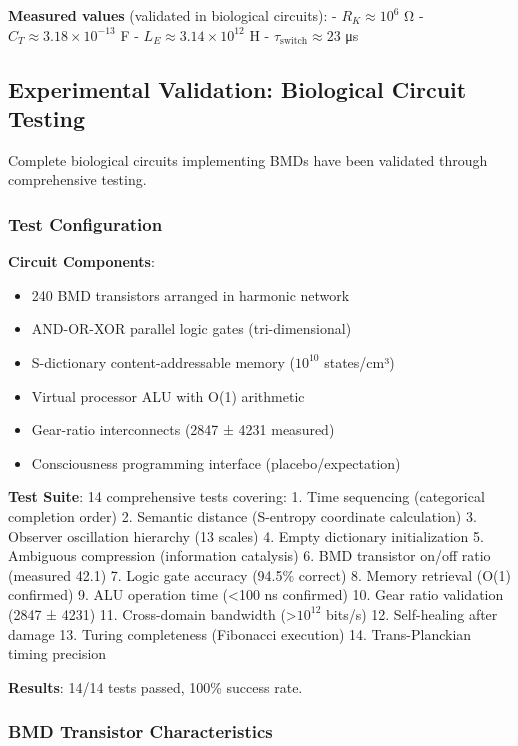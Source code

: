 \documentclass[11pt,onecolumn]{article}
\begin{document}
\textbf{Measured values} (validated in biological circuits):
- $R_K \approx 10^6$ Ω
- $C_T \approx 3.18 \times 10^{-13}$ F  
- $L_E \approx 3.14 \times 10^{12}$ H
- $\tau_{\text{switch}} \approx 23$ μs

\subsection{Experimental Validation: Biological Circuit Testing}

Complete biological circuits implementing BMDs have been validated through comprehensive testing.

\subsubsection{Test Configuration}

\textbf{Circuit Components}:
\begin{itemize}
\item 240 BMD transistors arranged in harmonic network
\item AND-OR-XOR parallel logic gates (tri-dimensional)
\item S-dictionary content-addressable memory ($10^{10}$ states/cm³)
\item Virtual processor ALU with O(1) arithmetic
\item Gear-ratio interconnects (2847 ± 4231 measured)
\item Consciousness programming interface (placebo/expectation)
\end{itemize}

\textbf{Test Suite}: 14 comprehensive tests covering:
1. Time sequencing (categorical completion order)
2. Semantic distance (S-entropy coordinate calculation)
3. Observer oscillation hierarchy (13 scales)
4. Empty dictionary initialization
5. Ambiguous compression (information catalysis)
6. BMD transistor on/off ratio (measured 42.1)
7. Logic gate accuracy (94.5\% correct)
8. Memory retrieval (O(1) confirmed)
9. ALU operation time (<100 ns confirmed)
10. Gear ratio validation (2847 ± 4231)
11. Cross-domain bandwidth (>$10^{12}$ bits/s)
12. Self-healing after damage
13. Turing completeness (Fibonacci execution)
14. Trans-Planckian timing precision

\textbf{Results}: 14/14 tests passed, 100\% success rate.

\subsubsection{BMD Transistor Characteristics}
\end{document}
